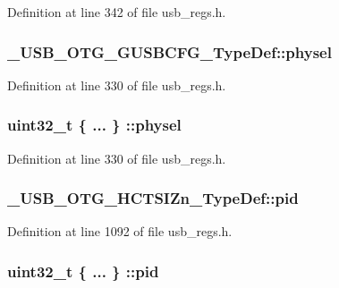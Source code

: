 Definition at line 342 of file usb\-\_\-regs.\-h.

\hypertarget{group___u_s_b___o_t_g___d_r_i_v_e_r_gaef0dede35984b2d149038b79a2baed90}{
\subsubsection[{physel}]{ \-\_\-\-U\-S\-B\-\_\-\-O\-T\-G\-\_\-\-G\-U\-S\-B\-C\-F\-G\-\_\-\-Type\-Def\-::physel}}\label{group___u_s_b___o_t_g___d_r_i_v_e_r_gaef0dede35984b2d149038b79a2baed90}


Definition at line 330 of file usb\-\_\-regs.\-h.

\hypertarget{group___u_s_b___o_t_g___d_r_i_v_e_r_gad75c34c1d6e6f46193506c4b8c249fcd}{
\subsubsection[{physel}]{\setlength{\rightskip}{0pt plus 5cm}uint32\-\_\-t \{ ... \} \-::physel}}\label{group___u_s_b___o_t_g___d_r_i_v_e_r_gad75c34c1d6e6f46193506c4b8c249fcd}


Definition at line 330 of file usb\-\_\-regs.\-h.

\hypertarget{group___u_s_b___o_t_g___d_r_i_v_e_r_gaf18e11b9b2811283695800e8afef88a2}{
\subsubsection[{pid}]{ \-\_\-\-U\-S\-B\-\_\-\-O\-T\-G\-\_\-\-H\-C\-T\-S\-I\-Zn\-\_\-\-Type\-Def\-::pid}}\label{group___u_s_b___o_t_g___d_r_i_v_e_r_gaf18e11b9b2811283695800e8afef88a2}


Definition at line 1092 of file usb\-\_\-regs.\-h.

\hypertarget{group___u_s_b___o_t_g___d_r_i_v_e_r_ga008d5723a17eb01411c9cd0cc7ee58d2}{
\subsubsection[{pid}]{\setlength{\rightskip}{0pt plus 5cm}uint32\-\_\-t \{ ... \} \-::{\bf pid}}}\label{group___u_s_b___o_t_g___d_r_i_v_e_r_ga008d5723a17eb01411c9cd0cc7ee58d2}



